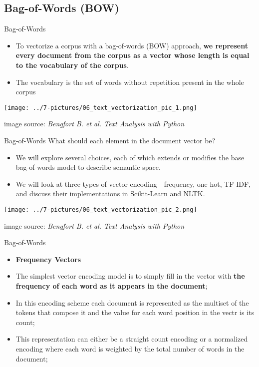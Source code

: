 \documentclass[11pt]{beamer}
\begin{document}
\subsection{Bag-of-Words (BOW) \\ \scalebox{0.8}{}}
\begin{frame}{Bag-of-Words}
	\begin{itemize}
		\item To vectorize a corpus with a bag-of-words (BOW) approach, \textbf{we represent every document from the corpus as a vector whose length is equal to the vocabulary of the corpus}.
		\item The vocabulary is the set of words without repetition present in the whole corpus
	\end{itemize}
	\begin{center}
	\texttt{[image: ../7-pictures/06\_text\_vectorization\_pic\_1.png]}
	\end{center}
	\footnotesize{image source: \textit{Bengfort B. et al. Text Analysis with Python}}
\end{frame}
\begin{frame}{Bag-of-Words}
What should each element in the document vector be?
	\begin{itemize}
		\item We will explore several choices, each of which extends or modifies the base bag-of-words model to describe semantic space. 
		\item We will look at three types of vector encoding - frequency, one-hot, TF-IDF, - and discuss their implementations in Scikit-Learn and NLTK.
	\end{itemize}
	\begin{center}
	\texttt{[image: ../7-pictures/06\_text\_vectorization\_pic\_2.png]}
	\end{center}
	\footnotesize{image source: \textit{Bengfort B. et al. Text Analysis with Python}}
\end{frame}
\begin{frame}{Bag-of-Words}
	\begin{itemize}
		\item \textbf{Frequency Vectors}
		\item The simplest vector encoding model is to simply fill in the vector with \textbf{the frequency of each word as it appears in the document};
		\item In this encoding scheme each document is represented as the multiset of the tokens that compose it and the value for each word position in the vectr is its count;
		\item This representation can either be a straight count encoding or a normalized encoding where each word is weighted by the total number of words in the document;
	\end{itemize}
\end{frame}
\end{document}
